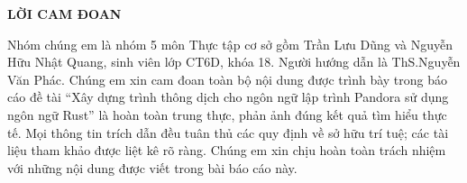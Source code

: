 \begin{center}
    \bf{LỜI CAM ĐOAN}
\end{center}

Nhóm chúng em là nhóm 5 môn Thực tập cơ sở gồm Trần Lưu Dũng và Nguyễn Hữu Nhật Quang, sinh viên lớp CT6D, khóa 18. Người
hướng dẫn là ThS.Nguyễn Văn Phác. Chúng em xin cam đoan toàn bộ nội dung được trình
bày trong báo cáo đề tài “Xây dựng trình thông dịch cho ngôn ngữ lập
trình Pandora sử dụng ngôn ngữ Rust” là hoàn toàn trung
thực, phản ảnh đúng kết quả tìm hiểu thực tế. Mọi thông tin trích dẫn đều tuân thủ các
quy định về sở hữu trí tuệ; các tài liệu tham khảo được liệt kê rõ ràng. Chúng em xin
chịu hoàn toàn trách nhiệm với những nội dung được viết trong bài báo cáo này.